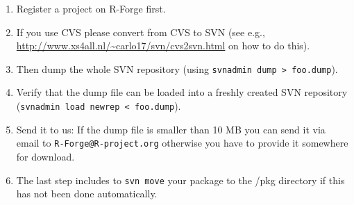 \documentclass[a4paper]{article}
\let\code=\texttt
\let\email=\texttt
\newcommand{\pkg}[1]{{\normalfont\fontseries{b}\selectfont #1}}
\newcommand{\proglang}[1]{\textsf{#1}}
\begin{document}
\begin{enumerate}
\item Register a project on \proglang{R}-Forge first.
\item If you use CVS please convert from CVS to SVN (see e.g.,
  \url{http://www.xs4all.nl/~carlo17/svn/cvs2svn.html} on how to do
  this).
\item Then dump the whole SVN repository (using \code{svnadmin dump >
    foo.dump}).
\item Verify that the dump file can be loaded into a freshly created
  SVN repository (\code{svnadmin load newrep < foo.dump}). 
\item Send it to us: If the dump file is smaller than 10 MB you can
  send it via email to \email{R-Forge@R-project.org} otherwise you have to
  provide it somewhere for download. 
\item The last step includes to \code{svn move} your package
  to the /pkg directory if this has not been done automatically.
\end{enumerate}


\end{document}
